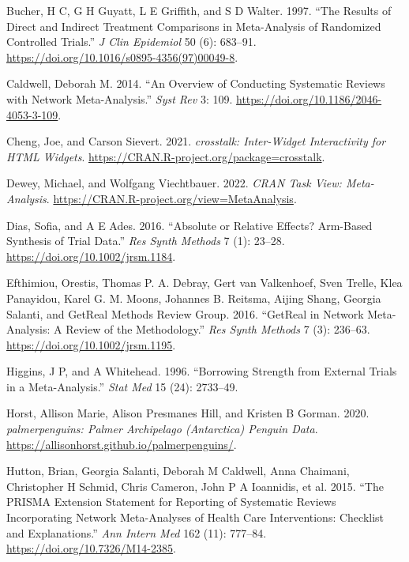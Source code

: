 \hypertarget{refs}{}
\begin{CSLReferences}{1}{0}
\leavevmode{}%
Bucher, H C, G H Guyatt, L E Griffith, and S D Walter. 1997. {``The Results of Direct and Indirect Treatment Comparisons in Meta-Analysis of Randomized Controlled Trials.''} \emph{J Clin Epidemiol} 50 (6): 683--91. \url{https://doi.org/10.1016/s0895-4356(97)00049-8}.

\leavevmode{}%
Caldwell, Deborah M. 2014. {``An Overview of Conducting Systematic Reviews with Network Meta-Analysis.''} \emph{Syst Rev} 3: 109. \url{https://doi.org/10.1186/2046-4053-3-109}.

\leavevmode{}%
Cheng, Joe, and Carson Sievert. 2021. \emph{{crosstalk}: Inter-Widget Interactivity for HTML Widgets}. \url{https://CRAN.R-project.org/package=crosstalk}.

\leavevmode{}%
Dewey, Michael, and Wolfgang Viechtbauer. 2022. \emph{{CRAN Task View}: Meta-Analysis}. \url{https://CRAN.R-project.org/view=MetaAnalysis}.

\leavevmode{}%
Dias, Sofia, and A E Ades. 2016. {``Absolute or Relative Effects? Arm-Based Synthesis of Trial Data.''} \emph{Res Synth Methods} 7 (1): 23--28. \url{https://doi.org/10.1002/jrsm.1184}.

\leavevmode{}%
Efthimiou, Orestis, Thomas P. A. Debray, Gert van Valkenhoef, Sven Trelle, Klea Panayidou, Karel G. M. Moons, Johannes B. Reitsma, Aijing Shang, Georgia Salanti, and GetReal Methods Review Group. 2016. {``GetReal in Network Meta-Analysis: A Review of the Methodology.''} \emph{Res Synth Methods} 7 (3): 236--63. \url{https://doi.org/10.1002/jrsm.1195}.

\leavevmode{}%
Higgins, J P, and A Whitehead. 1996. {``Borrowing Strength from External Trials in a Meta-Analysis.''} \emph{Stat Med} 15 (24): 2733--49.

\leavevmode{}%
Horst, Allison Marie, Alison Presmanes Hill, and Kristen B Gorman. 2020. \emph{{palmerpenguins}: Palmer Archipelago (Antarctica) Penguin Data}. \url{https://allisonhorst.github.io/palmerpenguins/}.

\leavevmode{}%
Hutton, Brian, Georgia Salanti, Deborah M Caldwell, Anna Chaimani, Christopher H Schmid, Chris Cameron, John P A Ioannidis, et al. 2015. {``The PRISMA Extension Statement for Reporting of Systematic Reviews Incorporating Network Meta-Analyses of Health Care Interventions: Checklist and Explanations.''} \emph{Ann Intern Med} 162 (11): 777--84. \url{https://doi.org/10.7326/M14-2385}.


\end{CSLReferences}
